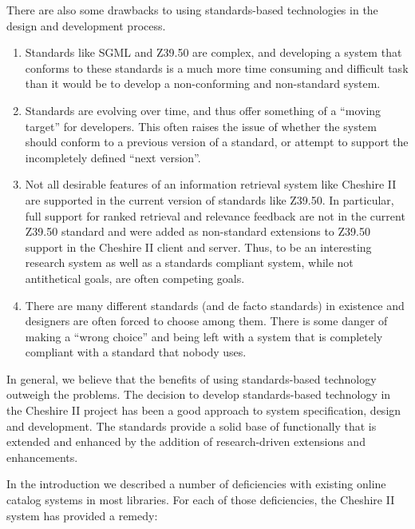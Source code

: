 There are also some drawbacks to using standards-based technologies in
the design and development process. 

\begin{enumerate}

\item Standards like SGML and Z39.50 are complex, and developing
a system that conforms to these standards is a much more time consuming
and difficult task than it would be to develop a non-conforming and
non-standard system.

\item Standards are evolving over time, and thus offer something of a 
``moving target'' for developers. This often raises the issue of whether
the system should conform to a previous version of a standard, or 
attempt to support the incompletely defined ``next version''.

\item Not all desirable features of an information retrieval system 
like Cheshire II are supported in the current version of standards like
Z39.50. In particular, full support for ranked retrieval and relevance feedback
are not in the current Z39.50 standard and were added as non-standard 
extensions to Z39.50 support in the Cheshire II client and server. Thus,
to be an interesting research system as well as a standards compliant
system, while not antithetical goals, are often competing goals.

\item There are many different standards (and de facto standards) in existence
and designers are often forced to choose among them. There is some danger
of making a ``wrong choice'' and being left with a system that is completely
compliant with a standard that nobody uses.

\end{enumerate}

In general, we believe that the benefits of using standards-based
technology outweigh the problems. The decision to develop
standards-based technology in the Cheshire II project has been a good
approach to system specification, design and development. The
standards provide a solid base of functionally that is extended and
enhanced by the addition of research-driven extensions and
enhancements.

In the introduction we described a number of deficiencies with existing
online catalog systems in most libraries. For each of those deficiencies,
the Cheshire II system has provided a remedy:

